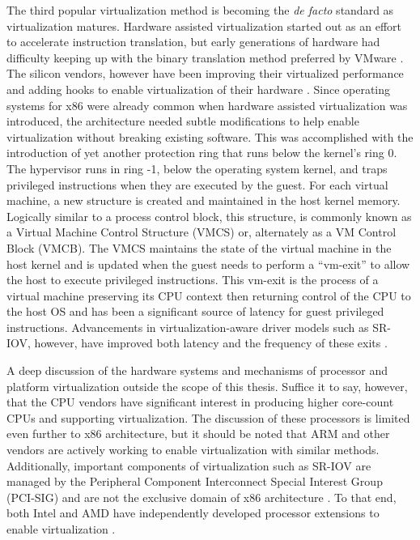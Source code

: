 The third popular virtualization method is becoming the \emph{de facto} standard as virtualization matures.
Hardware assisted virtualization started out as an effort to accelerate instruction translation, but early generations of hardware had difficulty keeping up with the binary translation method preferred by VMware \autocite{vmwareVT}.
The silicon vendors, however have been improving their virtualized performance and adding hooks to enable virtualization of their hardware \autocite{_grinberg_1}.
Since operating systems for x86 were already common when hardware assisted virtualization was introduced, the architecture needed subtle modifications to help enable virtualization without breaking existing software.  
This was accomplished with the introduction of yet another protection ring that runs below the kernel's ring 0.  
The hypervisor runs in ring -1, below the operating system kernel, and traps privileged instructions when they are executed by the guest.
For each virtual machine, a new structure is created and maintained in the host kernel memory.  
Logically similar to a process control block, this structure, is commonly known as a Virtual Machine Control Structure (VMCS) or, alternately as a VM Control Block (VMCB). 
The VMCS maintains the state of the virtual machine in the host kernel and is updated when the guest needs to perform a ``vm-exit'' to allow the host to execute privileged instructions.
This vm-exit is the process of a virtual machine preserving its CPU context then returning control of the CPU to the host OS and has been a significant source of latency for guest privileged instructions.
Advancements in virtualization-aware driver models such as SR-IOV, however, have improved both latency and the frequency of these exits \autocite{_nasa_1, _pcisig_1}.

A deep discussion of the hardware systems and mechanisms of processor and platform virtualization outside the scope of this thesis.
Suffice it to say, however, that the CPU vendors have significant interest in producing higher core-count CPUs and supporting virtualization.
The discussion of these processors is limited even further to x86 architecture, but it should be noted that ARM and other vendors are actively working to enable virtualization with similar methods.
Additionally, important components of virtualization such as SR-IOV are managed by the Peripheral Component Interconnect Special Interest Group (PCI-SIG) and are not the exclusive domain of x86 architecture \autocite{_pcisig_1}.
To that end, both Intel and AMD have independently developed processor extensions to enable virtualization \autocite{_grinberg_1}.

